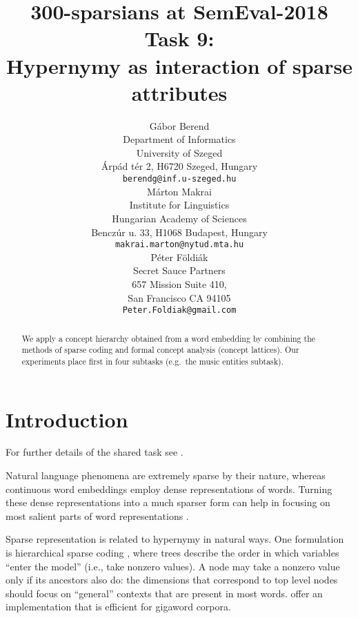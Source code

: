\documentclass[11pt,a4paper]{article}
\title{300-sparsians at SemEval-2018 Task 9: \\
Hypernymy as interaction of sparse attributes}
\author{Gábor Berend \\
Department of Informatics \\ University of Szeged \\
Árpád tér 2, H6720 Szeged, Hungary \\
{\tt berendg@inf.u-szeged.hu} \\\And
  Márton Makrai  \\
  Institute for Linguistics \\
  Hungarian Academy of Sciences \\
  Benczúr u. 33, H1068 Budapest, Hungary \\
  {\tt makrai.marton@nytud.mta.hu} \\\AND
  Péter Földiák \\
  Secret Sauce Partners \\
  657 Mission Suite 410, \\
  San Francisco CA 94105 \\
  {\tt Peter.Foldiak@gmail.com} \\}
\date{}
\begin{document}
\maketitle

\begin{abstract}
  We apply a concept hierarchy obtained from a word embedding by combining the
  methods of sparse coding and formal concept analysis (concept lattices).
  Our experiments place first in four subtasks (e.g.~the music entities
  subtask).
\end{abstract}




\section{Introduction}

For further details of the shared task see \citet{Camacho-Collados:2018}.

Natural language phenomena are extremely sparse by their nature, whereas
continuous word embeddings employ dense representations of words. Turning
these dense representations into a much sparser form can help in focusing on
most salient parts of word representations
\citep{Faruqui:2015,Berend:2017,Subramanian:2018}.

Sparse representation is related to hypernymy in natural ways.
One formulation is hierarchical sparse coding \citep{Zhao:2009}, where trees
describe the order in which variables “enter the model” (i.e., take nonzero
values). A node may take a nonzero value only if its ancestors also do: the
dimensions that correspond to top level nodes should focus on “general”
contexts that are present in most words. \citet{Yogatama:2015} offer an
implementation that is efficient for gigaword corpora.
\end{document}
